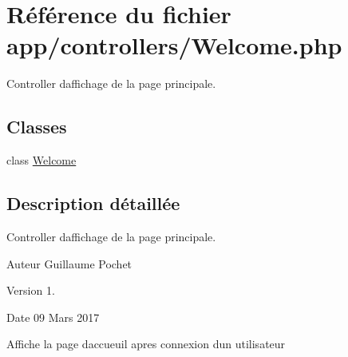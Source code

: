 \hypertarget{_welcome_8php}{}\section{Référence du fichier app/controllers/\+Welcome.php}
\label{_welcome_8php}


Controller d\textquotesingle{}affichage de la page principale.  


\subsection*{Classes}
\begin{DoxyCompactItemize}
\item 
class \hyperlink{class_welcome}{Welcome}
\end{DoxyCompactItemize}


\subsection{Description détaillée}
Controller d\textquotesingle{}affichage de la page principale. 

\begin{DoxyAuthor}{Auteur}
Guillaume Pochet 
\end{DoxyAuthor}
\begin{DoxyVersion}{Version}
1. 
\end{DoxyVersion}
\begin{DoxyDate}{Date}
09 Mars 2017
\end{DoxyDate}
Affiche la page d\textquotesingle{}accueuil apres connexion d\textquotesingle{}un utilisateur 